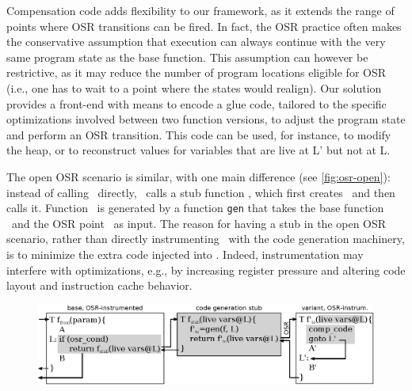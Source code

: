 Compensation code adds flexibility to our framework, as it extends the range of points where OSR transitions can be fired. In fact, the OSR practice often makes the conservative assumption that execution can always continue with the very same program state as the base function. %
This assumption can however be restrictive, as it may reduce the number of program locations eligible for OSR (i.e., one has to wait to a point where the states would realign). Our solution provides a front-end with means to encode a glue code, tailored to the specific optimizations involved between two function versions, to adjust the program state and perform an OSR transition. This code can be used, for instance, to modify the heap, or to reconstruct values for variables that are live at \textsf{L'} but not at \textsf{L}.

The open OSR scenario is similar, with one main difference (see \myfigure\ref{fig:osr-open}): instead of calling \fosrto\ directly, \fosrfrom\ calls a stub function \fstub, which first creates \fosrto\ and then calls it. Function \fosrto\ is generated by a function {\tt gen} that takes the base function \fbase\ and the OSR point \osrpoint\ as input. The reason for having a stub in the open OSR scenario, rather than directly instrumenting \fbase\ with the code generation machinery, is to minimize the extra code injected into \fbase. Indeed, instrumentation may interfere with optimizations, e.g., by increasing register pressure and altering code layout and instruction cache behavior. 

\ifdefined\noauthorea
\begin{figure}[t]
\begin{center}
\includegraphics[width=1.0\textwidth]{figures/osr-open/osr-open.eps}
\caption{\protect}
\end{center}
\end{figure}
\fi

